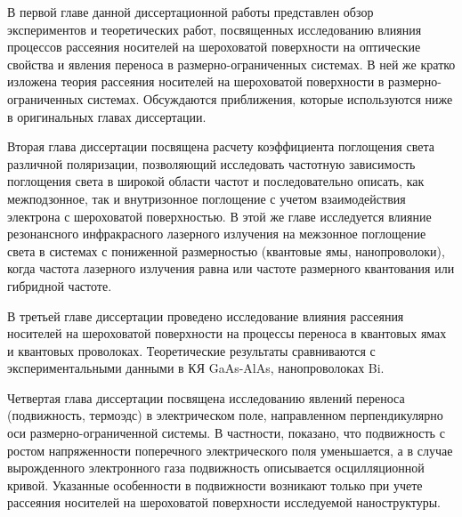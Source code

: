 \ifsynopsis
\else
В первой главе данной диссертационной работы представлен обзор экспериментов и теоретических работ, посвященных исследованию влияния процессов рассеяния носителей на шероховатой поверхности на оптические свойства и явления переноса в размерно-ограниченных системах. В ней же кратко изложена теория рассеяния носителей на шероховатой поверхности в размерно-ограниченных системах. Обсуждаются приближения, которые используются ниже в оригинальных главах диссертации.

Вторая глава диссертации посвящена расчету коэффициента поглощения света различной поляризации, позволяющий исследовать частотную зависимость поглощения света в широкой области частот и последовательно описать, как межподзонное, так и внутризонное поглощение с учетом взаимодействия электрона с шероховатой поверхностью.
В этой же главе исследуется влияние резонансного инфракрасного лазерного излучения на межзонное поглощение света в системах с пониженной размерностью (квантовые ямы, нанопроволоки), когда частота лазерного излучения равна или частоте размерного квантования или гибридной частоте.

В третьей главе диссертации проведено исследование влияния рассеяния носителей на шероховатой поверхности на процессы переноса в квантовых ямах и квантовых проволоках. Теоретические результаты сравниваются с экспериментальными данными в КЯ GaAs-AlAs, нанопроволоках Bi.

Четвертая глава диссертации посвящена исследованию явлений переноса (подвижность, термоэдс) в электрическом поле, направленном перпендикулярно оси размерно-ограниченной системы. В частности, показано, что подвижность с ростом напряженности поперечного электрического поля уменьшается, а в случае вырожденного электронного газа подвижность описывается осцилляционной кривой. Указанные особенности в подвижности возникают только при учете рассеяния носителей на шероховатой поверхности исследуемой наноструктуры.
\fi

